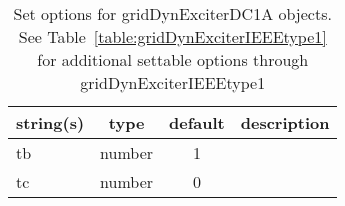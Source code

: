 \begin{table}[ht]
\centering
\begin{tabular}{p{5cm} c c p{7cm}}
\hline
string(s) & type & default & description \\
\hline
tb & number & 1 & \\
tc & number & 0 & \\
\hline
\end{tabular}
\caption{Set options for gridDynExciterDC1A objects. See Table~\ref{table:gridDynExciterIEEEtype1} for additional settable options through gridDynExciterIEEEtype1}
\label{table:gridDynExciterDC1A}
\end{table}
